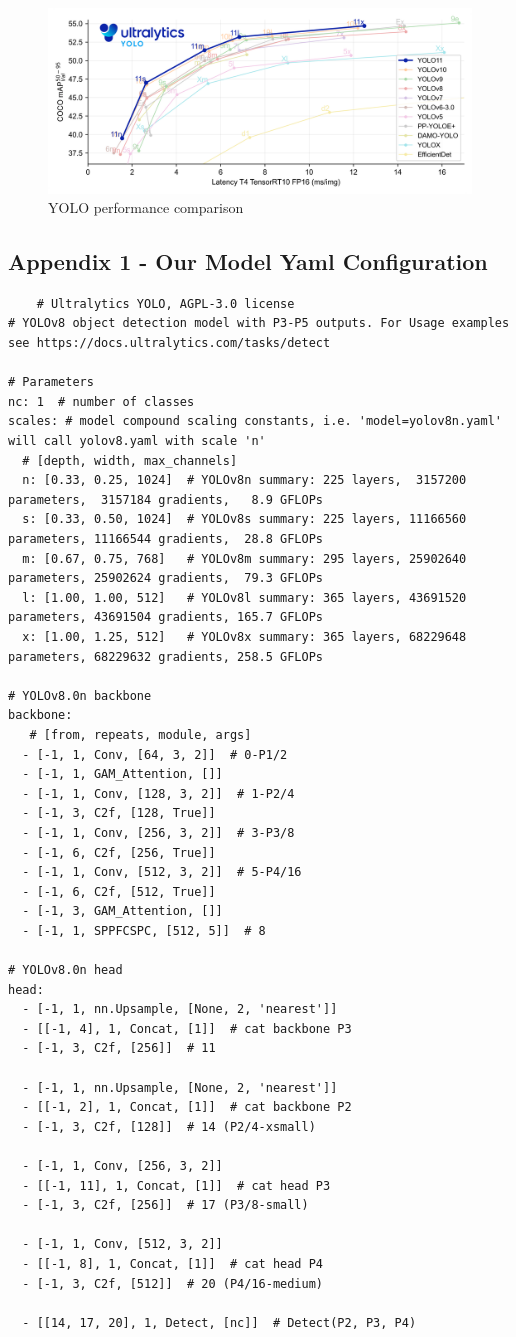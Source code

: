 \documentclass[10pt]{article}
\begin{document}
\begin{figure}[H]
    \centering
    \includegraphics[width=\textwidth]{images/performance-comparison.png}
    \caption{YOLO performance comparison}
    \label{fig:yolo_performance}
\end{figure}
\newpage
\subsection{Appendix 1 - Our Model Yaml Configuration}
\begin{lstlisting}
    # Ultralytics YOLO, AGPL-3.0 license
# YOLOv8 object detection model with P3-P5 outputs. For Usage examples see https://docs.ultralytics.com/tasks/detect

# Parameters
nc: 1  # number of classes
scales: # model compound scaling constants, i.e. 'model=yolov8n.yaml' will call yolov8.yaml with scale 'n'
  # [depth, width, max_channels]
  n: [0.33, 0.25, 1024]  # YOLOv8n summary: 225 layers,  3157200 parameters,  3157184 gradients,   8.9 GFLOPs
  s: [0.33, 0.50, 1024]  # YOLOv8s summary: 225 layers, 11166560 parameters, 11166544 gradients,  28.8 GFLOPs
  m: [0.67, 0.75, 768]   # YOLOv8m summary: 295 layers, 25902640 parameters, 25902624 gradients,  79.3 GFLOPs
  l: [1.00, 1.00, 512]   # YOLOv8l summary: 365 layers, 43691520 parameters, 43691504 gradients, 165.7 GFLOPs
  x: [1.00, 1.25, 512]   # YOLOv8x summary: 365 layers, 68229648 parameters, 68229632 gradients, 258.5 GFLOPs

# YOLOv8.0n backbone
backbone:
   # [from, repeats, module, args]
  - [-1, 1, Conv, [64, 3, 2]]  # 0-P1/2
  - [-1, 1, GAM_Attention, []]
  - [-1, 1, Conv, [128, 3, 2]]  # 1-P2/4
  - [-1, 3, C2f, [128, True]]
  - [-1, 1, Conv, [256, 3, 2]]  # 3-P3/8
  - [-1, 6, C2f, [256, True]]
  - [-1, 1, Conv, [512, 3, 2]]  # 5-P4/16
  - [-1, 6, C2f, [512, True]]
  - [-1, 3, GAM_Attention, []]
  - [-1, 1, SPPFCSPC, [512, 5]]  # 8

# YOLOv8.0n head
head:
  - [-1, 1, nn.Upsample, [None, 2, 'nearest']]
  - [[-1, 4], 1, Concat, [1]]  # cat backbone P3
  - [-1, 3, C2f, [256]]  # 11

  - [-1, 1, nn.Upsample, [None, 2, 'nearest']]
  - [[-1, 2], 1, Concat, [1]]  # cat backbone P2
  - [-1, 3, C2f, [128]]  # 14 (P2/4-xsmall)

  - [-1, 1, Conv, [256, 3, 2]]
  - [[-1, 11], 1, Concat, [1]]  # cat head P3
  - [-1, 3, C2f, [256]]  # 17 (P3/8-small)

  - [-1, 1, Conv, [512, 3, 2]]
  - [[-1, 8], 1, Concat, [1]]  # cat head P4
  - [-1, 3, C2f, [512]]  # 20 (P4/16-medium)

  - [[14, 17, 20], 1, Detect, [nc]]  # Detect(P2, P3, P4)
\end{lstlisting}
\newpage
\end{document}
